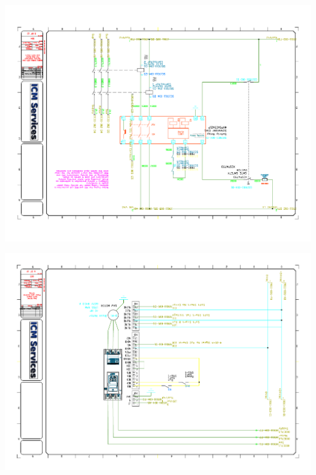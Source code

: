 \begin{center}
	\includegraphics[width=7.5in,angle=90]{../DRAWINGS/19011-004.pdf}
	\label{schem:004} %
\end{center}
\begin{center}
	\includegraphics[width=7.5in,angle=90]{../DRAWINGS/19011-005.pdf}
	\label{schem:005} %
\end{center}
